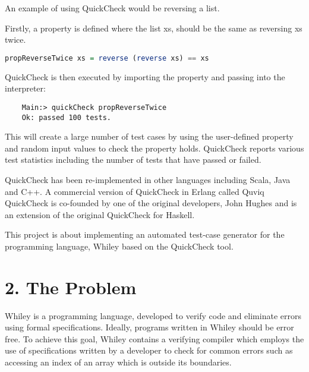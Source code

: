 \documentclass[11pt, a4paper, twoside, openright]{report}
\begin{document}
An example of using QuickCheck would be reversing a list.

Firstly, a property is defined where the list xs, should be the same as reversing xs twice.

\begin{lstlisting}[language=haskell]
	propReverseTwice xs = reverse (reverse xs) == xs
\end{lstlisting}

QuickCheck is then executed by importing the property and passing into the interpreter:

\begin{lstlisting}
	Main:> quickCheck propReverseTwice
	Ok: passed 100 tests.
\end{lstlisting}

This will create a large number of test cases by using the user-defined property and random input values to check the property holds. QuickCheck reports various test statistics including the number of tests that have passed or failed.

QuickCheck has been re-implemented in other languages including Scala, Java and C++. A commercial version of QuickCheck in Erlang called Quviq QuickCheck is co-founded by one of the original developers, John Hughes and is an extension of the original QuickCheck for Haskell.

This project is about implementing an automated test-case generator for the programming language, Whiley based on the QuickCheck tool. 

%
%
%

\section*{2. The Problem}
Whiley is a programming language, developed to verify code and eliminate errors using formal specifications. 
Ideally, programs written in Whiley should be error free.
To achieve this goal, Whiley contains a verifying compiler which employs the use of specifications written by a developer to check for common errors such as accessing an index of an array which is outside its boundaries.
\end{document}

